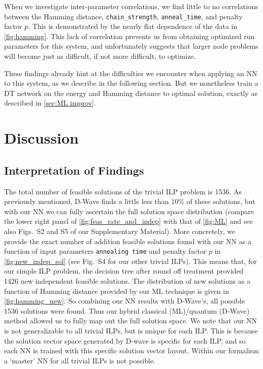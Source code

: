 \documentclass[utf8, nocrop]{FrontiersinHarvardArxiv}
\begin{document}
When we investigate inter-parameter correlations, we find little to no correlations between the Hamming distance, \texttt{chain\_strength}, \texttt{anneal\_time}, and penalty factor $p$.
This is demonstrated by the nearly flat dependence of the data in \autoref{fig:hamming}. 
This lack of correlation prevents us from obtaining optimized run parameters for this system, and unfortunately suggests that larger node problems will become just as difficult, if not more difficult, to optimize.

These findings already hint at the difficulties we encounter when applying an NN to this system, as we describe in the following section.
But we nonetheless train a DT network on the energy and Hamming distance to optimal solution, exactly as described in \autoref{sec:ML improv}.

\section{Discussion}
\label{sec:conclusion}

\subsection{Interpretation of Findings}
The total number of feasible solutions of the trivial ILP problem is 1536. 
As previously mentioned, D-Wave finds a little less than 10\% of these solutions, but with our NN we can fully ascertain the full solution space distribution (compare the lower right panel of \autoref{fig:feas_rate_and_indep} with that of \autoref{fig:ML} and see also Figs.~S2 and S5 of our Supplementary Material). 
More concretely, we provide the exact number of addition feasible solutions found with our NN as a function of input parameters \texttt{annealing time} and penalty factor $p$ in \autoref{fig:new_indep_sol} (see Fig.~S4 for our other trivial ILPs). 
This means that, for our simple ILP problem, the decision tree after round off treatment provided 1426 new independent feasible solutions.
The distribution of new solutions as a function of Hamming distance provided by our ML technique is given in \autoref{fig:hamming_new}.
So combining our NN results with D-Wave's, all possible 1536 solutions were found.
Thus our hybrid classical (ML)/quantum (D-Wave) method allowed us to fully map out the full solution space.
We note that our NN is not generalizable to all trivial ILPs, but is unique for each ILP.
This is because the solution vector space generated by D-wave is specific for each ILP, and so each NN is trained with this specific solution vector layout.
Within our formalism a `master' NN for all trivial ILPs is not possible.
\end{document}
